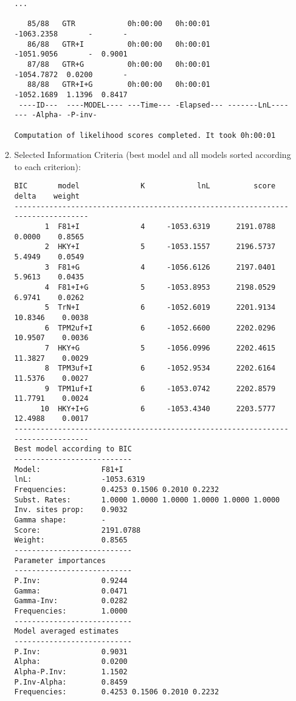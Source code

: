 \begin{enumerate}
\begin{enumerate}
\begin{lstlisting}
...

   85/88   GTR            0h:00:00   0h:00:01           -1063.2358       -       -
   86/88   GTR+I          0h:00:00   0h:00:01           -1051.9056       -  0.9001
   87/88   GTR+G          0h:00:00   0h:00:01           -1054.7872  0.0200       -
   88/88   GTR+I+G        0h:00:00   0h:00:01           -1052.1689  1.1396  0.8417
 ----ID---  ----MODEL---- ---Time--- -Elapsed--- -------LnL------- -Alpha- -P-inv-

Computation of likelihood scores completed. It took 0h:00:01
\end{lstlisting}

\item Selected Information Criteria (best model and all models sorted according to each criterion):

\begin{lstlisting}
BIC       model              K            lnL          score          delta    weight
--------------------------------------------------------------------------------
       1  F81+I              4     -1053.6319      2191.0788         0.0000    0.8565
       2  HKY+I              5     -1053.1557      2196.5737         5.4949    0.0549
       3  F81+G              4     -1056.6126      2197.0401         5.9613    0.0435
       4  F81+I+G            5     -1053.8953      2198.0529         6.9741    0.0262
       5  TrN+I              6     -1052.6019      2201.9134        10.8346    0.0038
       6  TPM2uf+I           6     -1052.6600      2202.0296        10.9507    0.0036
       7  HKY+G              5     -1056.0996      2202.4615        11.3827    0.0029
       8  TPM3uf+I           6     -1052.9534      2202.6164        11.5376    0.0027
       9  TPM1uf+I           6     -1053.0742      2202.8579        11.7791    0.0024
      10  HKY+I+G            6     -1053.4340      2203.5777        12.4988    0.0017
--------------------------------------------------------------------------------
Best model according to BIC
---------------------------
Model:              F81+I
lnL:                -1053.6319
Frequencies:        0.4253 0.1506 0.2010 0.2232
Subst. Rates:       1.0000 1.0000 1.0000 1.0000 1.0000 1.0000
Inv. sites prop:    0.9032
Gamma shape:        -
Score:              2191.0788
Weight:             0.8565
---------------------------
Parameter importances
---------------------------
P.Inv:              0.9244
Gamma:              0.0471
Gamma-Inv:          0.0282
Frequencies:        1.0000
---------------------------
Model averaged estimates
---------------------------
P.Inv:              0.9031
Alpha:              0.0200
Alpha-P.Inv:        1.1502
P.Inv-Alpha:        0.8459
Frequencies:        0.4253 0.1506 0.2010 0.2232


\end{lstlisting}
\end{enumerate}
\end{enumerate}
